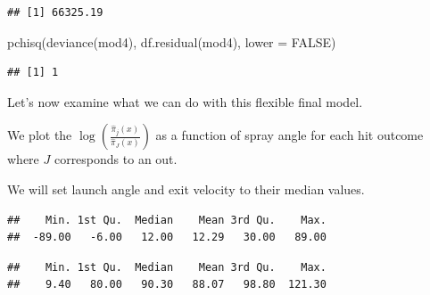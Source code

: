 \documentclass[
  ignorenonframetext,
]{beamer}
\newenvironment{Shaded}{\begin{snugshade}}{\end{snugshade}}
\newcommand{\AttributeTok}[1]{\textcolor[rgb]{0.77,0.63,0.00}{#1}}
\newcommand{\ConstantTok}[1]{\textcolor[rgb]{0.00,0.00,0.00}{#1}}
\newcommand{\FunctionTok}[1]{\textcolor[rgb]{0.00,0.00,0.00}{#1}}
\newcommand{\NormalTok}[1]{#1}
\newcommand{\SpecialCharTok}[1]{\textcolor[rgb]{0.00,0.00,0.00}{#1}}
\begin{document}
\begin{frame}[fragile]{}
\begin{verbatim}
## [1] 66325.19
\end{verbatim}

\begin{Shaded}
\begin{Highlighting}[]
\FunctionTok{pchisq}\NormalTok{(}\FunctionTok{deviance}\NormalTok{(mod4), }\FunctionTok{df.residual}\NormalTok{(mod4), }\AttributeTok{lower =} \ConstantTok{FALSE}\NormalTok{)}
\end{Highlighting}
\end{Shaded}

\begin{verbatim}
## [1] 1
\end{verbatim}
\end{frame}

\begin{frame}[fragile]{}
\protect\hypertarget{section-15}{}
Let's now examine what we can do with this flexible final model.

\vspace{12pt}

We plot the \(\log\left(\frac{\hat\pi_j(x)}{\hat\pi_J(x)}\right)\) as a
function of spray angle for each hit outcome where \(J\) corresponds to
an out.

\vspace{12pt}

We will set launch angle and exit velocity to their median values.

\vspace{12pt}
\tiny

\begin{Shaded}
\end{Shaded}

\begin{verbatim}
##    Min. 1st Qu.  Median    Mean 3rd Qu.    Max. 
##  -89.00   -6.00   12.00   12.29   30.00   89.00
\end{verbatim}

\begin{Shaded}
\end{Shaded}

\begin{verbatim}
##    Min. 1st Qu.  Median    Mean 3rd Qu.    Max. 
##    9.40   80.00   90.30   88.07   98.80  121.30
\end{verbatim}


\end{frame}
\end{document}
